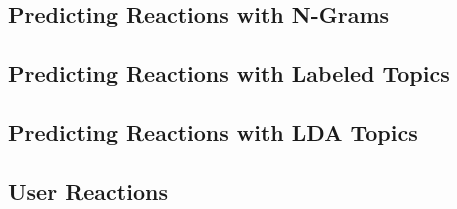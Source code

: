 
\subsection{Predicting Reactions with N-Grams}


\subsection{Predicting Reactions with Labeled Topics}


\subsection{Predicting Reactions with LDA Topics}


\subsection{User Reactions}


